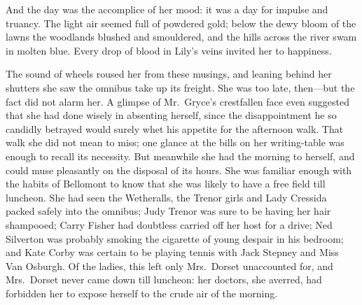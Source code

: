 \documentclass[12pt,a4paper]{book}
\begin{document}
And the day was the accomplice of her mood: it was a day for
impulse and truancy. The light air seemed full of powdered gold;
below the dewy bloom of the lawns the woodlands blushed and
smouldered, and the hills across the river swam in molten blue. 
Every drop of blood in Lily's veins invited her to happiness.





The sound of wheels roused her from these musings, and leaning
behind her shutters she saw the omnibus take up its freight. She
was too late, then---but the fact did not alarm her. A glimpse of
Mr.\ Gryce's crestfallen face even suggested that she had done
wisely in absenting herself, since the disappointment he so
candidly betrayed would surely whet his appetite for the
afternoon walk. That walk she did not mean to miss; one glance at
the bills on her writing-table was enough to recall its
necessity. But meanwhile she had the morning to herself, and
could muse pleasantly on the disposal of its hours. She was
familiar enough with the habits of Bellomont to know that she was
likely to have a free field till luncheon. She had seen the
Wetheralls, the Trenor girls and Lady Cressida packed safely into
the omnibus; Judy Trenor was sure to be having her hair
shampooed; Carry Fisher had doubtless carried off her host for a
drive; Ned Silverton was probably smoking the cigarette of young
despair in his bedroom; and Kate Corby was certain to be playing
tennis with Jack Stepney and Miss Van Osburgh. Of the ladies,
this left only Mrs.\ Dorset unaccounted for, and Mrs.\ Dorset never
came down till luncheon: her doctors, she averred, had forbidden
her to expose herself to the crude air of the morning.
\end{document}
